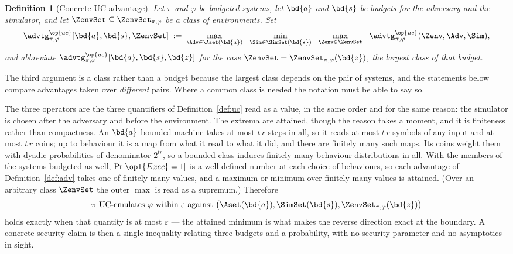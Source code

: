\documentclass[10pt,oneside,openany]{book}
\theoremstyle{accentdef}
\newtheorem{definition}{Definition}[chapter]
\theoremstyle{accentplain}
\begin{document}
\begin{definition}[Concrete UC advantage]\label{def:concadv}
Let $\pi$ and $\varphi$ be budgeted systems, let $\bd{a}$ and $\bd{s}$ be budgets for the adversary and the
simulator, and let $\ZenvSet \subseteq \ZenvSet_{\pi,\varphi}$ be a class of environments. Set
\[
  \advtg^{\op{uc}}_{\pi,\varphi}[\bd{a},\bd{s},\ZenvSet]
  \;:=\;
  \max_{\Adv \in \Aset(\bd{a})} \ \
  \min_{\Sim \in \SimSet(\bd{s})} \ \
  \max_{\Zenv \in \ZenvSet} \ \
  \advtg^{\op{uc}}_{\pi,\varphi}(\Zenv,\Adv,\Sim) ,
\]
and abbreviate $\advtg^{\op{uc}}_{\pi,\varphi}[\bd{a},\bd{s},\bd{z}]$ for the case
$\ZenvSet = \ZenvSet_{\pi,\varphi}(\bd{z})$, the largest class of that budget.
\end{definition}

The third argument is a class rather than a budget because the largest class depends on the pair
of systems, and the statements below compare advantages taken over \emph{different} pairs. Where
a common class is needed the notation must be able to say so.

The three operators are the three quantifiers of Definition~\ref{def:uc} read as a value, in the
same order and for the same reason: the simulator is chosen after the adversary and before the
environment. The extrema are attained, though the reason takes a moment, and it is finiteness
rather than compactness. An $\bd{a}$-bounded machine takes at most $t\,r$ steps in all, so it reads at most
$t\,r$ symbols of any input and at most $t\,r$ coins; up to behaviour it is a map from what it read to
what it did, and there are finitely many such maps. Its coins weight them with dyadic
probabilities of denominator $2^{t r}$, so a bounded class induces finitely many behaviour
distributions in all. With the members of the systems budgeted as well, $\Pr[\opl{Exec} = 1]$ is
a well-defined number at each choice of behaviours, so each advantage of
Definition~\ref{def:adv} takes one of finitely many values, and a maximum or minimum over
finitely many values is attained. (Over an arbitrary class $\ZenvSet$ the outer $\max$ is read as
a supremum.) Therefore
\[
  \pi \ \text{UC-emulates} \ \varphi \ \text{within} \ \varepsilon \ \text{against}
  \ \bigl(\Aset(\bd{a}),\SimSet(\bd{s}),\ZenvSet_{\pi,\varphi}(\bd{z})\bigr)
\]
holds exactly when that quantity is at most $\varepsilon$ --- the attained minimum is what makes
the reverse direction exact at the boundary. A concrete security claim is then a
single inequality relating three budgets and a probability, with no security parameter and no
asymptotics in sight.
\end{document}
